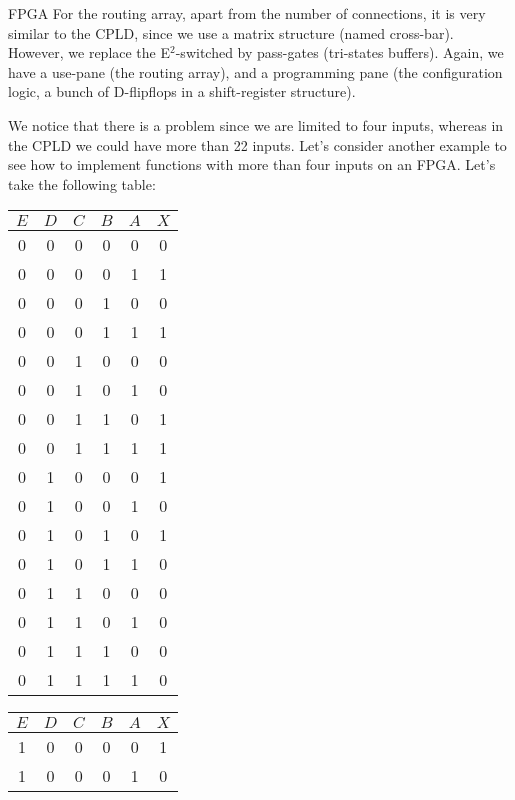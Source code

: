 \documentclass[a4paper]{article}
\begin{document}
\begin{parag}{FPGA}
    For the routing array, apart from the number of connections, it is very similar to the CPLD, since we use a matrix structure (named cross-bar). However, we replace the E$^2$-switched by pass-gates (tri-states buffers). Again, we have a use-pane (the routing array), and a programming pane (the configuration logic, a bunch of D-flipflops in a shift-register structure). 

    We notice that there is a problem since we are limited to four inputs, whereas in the CPLD we could have more than 22 inputs. Let's consider another example to see how to implement functions with more than four inputs on an FPGA. Let's take the following table: 
    \begin{center}
        \begin{tabular}{ccccc|c}
            $E$ & $D$ & $C$ & $B$ & $A$ & $X$ \\
            \hline
            0 & 0 & 0 & 0 & 0 & 0 \\
            0 & 0 & 0 & 0 & 1 & 1 \\
            0 & 0 & 0 & 1 & 0 & 0 \\
            0 & 0 & 0 & 1 & 1 & 1 \\
            0 & 0 & 1 & 0 & 0 & 0 \\
            0 & 0 & 1 & 0 & 1 & 0 \\
            0 & 0 & 1 & 1 & 0 & 1 \\
            0 & 0 & 1 & 1 & 1 & 1 \\
            0 & 1 & 0 & 0 & 0 & 1 \\
            0 & 1 & 0 & 0 & 1 & 0 \\
            0 & 1 & 0 & 1 & 0 & 1 \\
            0 & 1 & 0 & 1 & 1 & 0 \\
            0 & 1 & 1 & 0 & 0 & 0 \\
            0 & 1 & 1 & 0 & 1 & 0 \\
            0 & 1 & 1 & 1 & 0 & 0 \\
            0 & 1 & 1 & 1 & 1 & 0 \\
        \end{tabular}
        \hspace{1em}
        \begin{tabular}{ccccc|c}
            $E$ & $D$ & $C$ & $B$ & $A$ & $X$ \\
            \hline
            1 & 0 & 0 & 0 & 0 & 1 \\
            1 & 0 & 0 & 0 & 1 & 0 \\

\end{tabular}
\end{center}
\end{parag}
\end{document}

